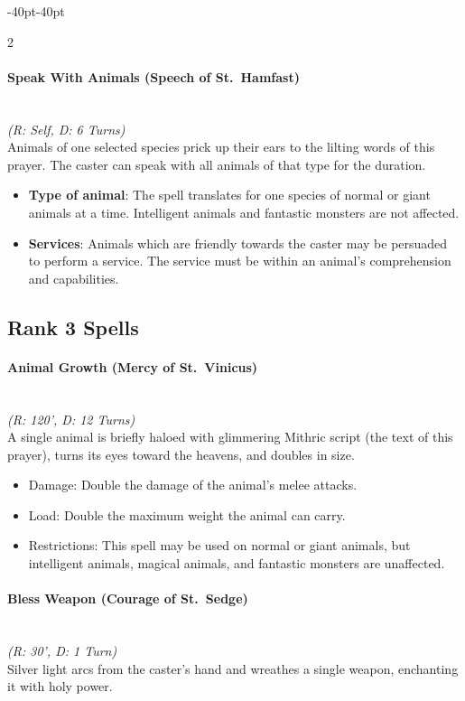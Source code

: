 \documentclass{book}
\providecommand{\tightlist}{%
\setlength{\itemsep}{0pt}\setlength{\parskip}{0pt}}
\begin{document}
\begin{adjustwidth}{-40pt}{-40pt}
\begin{multicols}{2}
\paragraph{Speak With Animals (Speech of
	St.~Hamfast)}\label{speak-with-animals-speech-of-st.-hamfast}\mbox{}\\
\emph{(R: Self, D: 6 Turns)}\\
Animals of one selected species prick up their ears to the lilting words
of this prayer. The caster can speak with all animals of that type for
the duration.

\begin{itemize}
	\tightlist
	\item
	\textbf{Type of animal}: The spell translates for one species of
	normal or giant animals at a time. Intelligent animals and fantastic
	monsters are not affected.
	\item
	\textbf{Services}: Animals which are friendly towards the caster may
	be persuaded to perform a service. The service must be within an
	animal's comprehension and capabilities.
\end{itemize}

\subsection*{Rank 3 Spells}\label{rank-3-holy}

\paragraph{Animal Growth (Mercy of
	St.~Vinicus)}\label{animal-growth-mercy-of-st.-vinicus}\mbox{}\\
\emph{(R: 120', D: 12 Turns)}\\
A single animal is briefly haloed with glimmering Mithric script (the
text of this prayer), turns its eyes toward the heavens, and doubles in
size.

\begin{itemize}
	\tightlist
	\item
	Damage: Double the damage of the animal's melee attacks.
	\item
	Load: Double the maximum weight the animal can carry.
	\item
	Restrictions: This spell may be used on normal or giant animals, but
	intelligent animals, magical animals, and fantastic monsters are
	unaffected.
\end{itemize}

\paragraph{Bless Weapon (Courage of
	St.~Sedge)}\label{bless-weapon-courage-of-st.-sedge}\mbox{}\\
\emph{(R: 30', D: 1 Turn)}\\
Silver light arcs from the caster's hand and wreathes a single weapon,
enchanting it with holy power.


\end{multicols}
\end{adjustwidth}
\end{document}
